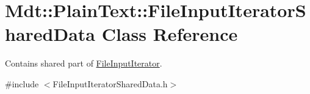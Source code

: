 \hypertarget{class_mdt_1_1_plain_text_1_1_file_input_iterator_shared_data}{}\section{Mdt\+:\+:Plain\+Text\+:\+:File\+Input\+Iterator\+Shared\+Data Class Reference}
\label{class_mdt_1_1_plain_text_1_1_file_input_iterator_shared_data}


Contains shared part of \hyperlink{struct_mdt_1_1_plain_text_1_1_file_input_iterator}{File\+Input\+Iterator}.  




{\ttfamily \#include $<$File\+Input\+Iterator\+Shared\+Data.\+h$>$}

